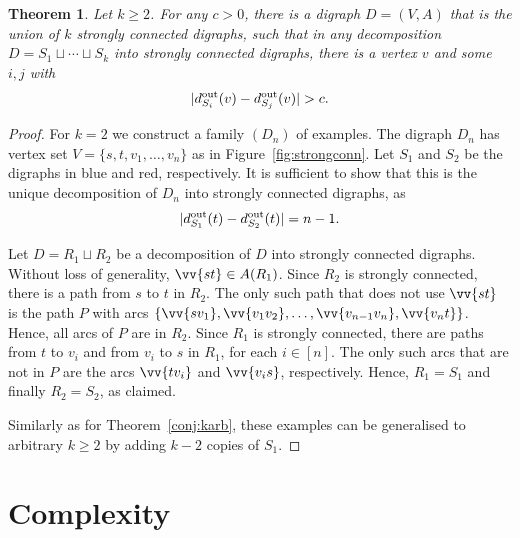 \documentclass[11pt, reqno, a4paper]{article}
\newtheorem{theorem}{Theorem}
\theoremstyle{definition}
\numberwithin{equation}{section}
\renewcommand{\geq}{\geqslant}
\begin{document}
\begin{theorem}\label{conj:kstrongdigraphs} 
Let $k\geq 2$.
For any $c>0$, there is a digraph $D= (V,A)$ that is the union of $k$ strongly connected digraphs,
such that in any decomposition $D= S_1\sqcup \dotsb \sqcup S_k$ into strongly connected digraphs,
there is a vertex $v$ and some $i,j$ with
\begin{equation*}
|d^{\textup{out}}_{S_i}(v)- d^{\textup{out}}_{S_j}(v)| > c.
\end{equation*}
\end{theorem}
\begin{proof}
For $k=2$ we construct a family $(D_n)$ of examples.
The digraph $D_n$ has vertex set $V = \{ s,t, v_1,\dotsc, v_n\}$ as in Figure~\ref{fig:strongconn}.
Let $S_1$ and $S_2$ be the digraphs in blue and red, respectively.
It is sufficient to show that this is the unique decomposition of $D_n$ into strongly connected digraphs, as
\begin{equation*}
    |d^{\textup{out}}_{S_1}(t) - d^{\textup{out}}_{S_2}(t)| = n-1.
\end{equation*}

Let $D = R_1 \sqcup R_2$ be a decomposition of $D$ into strongly connected digraphs.
Without loss of generality, $\vv{st}\in A(R_1)$.
Since $R_2$ is strongly connected, there is a path from $s$ to $t$ in $R_2$.
The only such path that does not use $\vv{st}$ is the path $P$ with arcs $\{\vv{sv_1}, \vv{v_1v_2},\dotsc, \vv{v_{n-1}v_n}, \vv{v_nt}\}$.
Hence, all arcs of $P$ are in $R_2$.
Since $R_1$ is strongly connected, there are paths from $t$ to $v_i$ and from $v_i$ to $s$ in $R_1$, for each $i\in [n]$.
The only such arcs that are not in $P$ are the arcs $\vv{tv_i}$ and $\vv{v_is}$, respectively.
Hence, $R_1 = S_1$ and finally $R_2= S_2$, as claimed.

Similarly as for Theorem~\ref{conj:karb}, these examples can be generalised to arbitrary $k\geq 2$ by adding \(k - 2\) copies of \(S_1\).
\end{proof}

\section{Complexity}\label{sec:NP}
\end{document}
